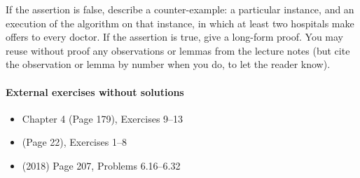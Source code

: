 \documentclass[11pt]{article}
\begin{document}
If the assertion is false, describe a counter-example:
a particular instance, and an execution of the algorithm on that instance,
in which at least two hospitals make offers to every doctor.
If the assertion is true, give a long-form proof.
You may reuse without proof any observations or lemmas from the lecture notes
(but cite the observation or lemma by number when you do, to let the reader know).


\paragraph{External exercises without solutions}

\begin{itemize}
\item \JE Chapter 4 (Page 179), Exercises 9--13

\item \KT (Page 22), Exercises 1--8

\item \LLM (2018)  Page 207, Problems 6.16--6.32

\end{itemize}

\end{document}
